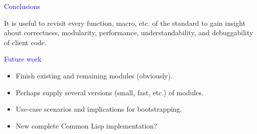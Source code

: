 \documentclass{slides}
\newcommand{\ti}[1]{\begin{center}\Large{\textcolor{blue}{#1}}\end{center}}
\begin{document}
\begin{slide}\ti{Conclusions}

It is useful to revisit every function, macro, etc. of the standard to
gain insight about correctness, modularity, performance,
understandability, and debuggability of client code.  

\vfill\end{slide}
\begin{slide}\ti{Future work}

\begin{itemize}
\item Finish existing and remaining modules (obviously).
\item Perhaps supply several versions (small, fast, etc.) of modules.
\item Use-case scenarios and implications for bootstrapping. 
\item New complete Common Lisp implementation?
\end{itemize}

\vfill\end{slide}



\end{document}
